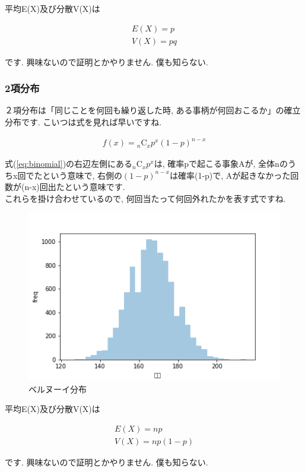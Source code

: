 \documentclass[11pt,a4paper,uplatex]{ujreport} 	%
\begin{document}
平均E(X)及び分散V(X)は

\begin{eqnarray}
E(X) = p\\
V(X) = pq
\end{eqnarray}

です. 興味ないので証明とかやりません. 僕も知らない.
\subsubsection{2項分布}
２項分布は「同じことを何回も繰り返した時, ある事柄が何回おこるか」の確立分布です. こいつは式を見れば早いですね.

\begin{eqnarray}
\label{eq:binomial}
f(x) = {}_n\mathrm{C}_x p^x(1-p)^{n-x}
\end{eqnarray}

式(\ref{eq:binomial})の右辺左側にある${}_n\mathrm{C}_x p^x$は, 確率pで起こる事象Aが, 全体nのうちx回でたという意味で, 右側の$(1-p)^{n-x}$は確率(1-p)で, Aが起きなかった回数が(n-x)回出たという意味です.\\
これらを掛け合わせているので, 何回当たって何回外れたかを表す式ですね.

\begin{figure}[H]
\label{im:bernoulli}
  \centering
  \includegraphics[width=120mm,bb=0 0 432 288]{figures/binomial.png}
  \caption{ベルヌーイ分布}
\end{figure}

平均E(X)及び分散V(X)は

\begin{eqnarray}
E(X) = np\\
V(X) = np(1-p)
\end{eqnarray}

です. 興味ないので証明とかやりません. 僕も知らない.
\end{document}
